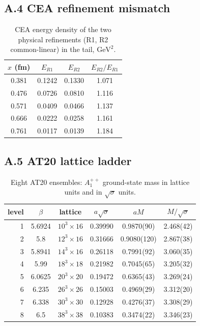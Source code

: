 \documentclass[11pt,a4paper]{article}
\theoremstyle{definition}
\theoremstyle{remark}
\newcommand{\sqs}{\sqrt{\sigma}}
\begin{document}
\subsection*{A.4 CEA refinement mismatch}
\begin{table}[ht]\centering\small\caption{CEA energy density of the two physical refinements (R1, R2 common-linear) in the tail, $\mathrm{GeV}^2$.}
\begin{tabular}{@{}cccc@{}}\toprule $x$ (fm) & $E_{R1}$ & $E_{R2}$ & $E_{R2}/E_{R1}$\\\midrule
0.381 & 0.1242 & 0.1330 & 1.071\\
0.476 & 0.0726 & 0.0810 & 1.116\\
0.571 & 0.0409 & 0.0466 & 1.137\\
0.666 & 0.0222 & 0.0258 & 1.161\\
0.761 & 0.0117 & 0.0139 & 1.184\\
\bottomrule\end{tabular}\end{table}
\subsection*{A.5 AT20 lattice ladder}
\begin{table}[ht]\centering\small\caption{Eight AT20 ensembles: $A_1^{++}$ ground-state mass in lattice units and in $\sqs$ units.}
\begin{tabular}{@{}rccccc@{}}\toprule level & $\beta$ & lattice & $a\sqs$ & $aM$ & $M/\sqs$\\\midrule
1 & 5.6924 & $10^3\times 16$ & 0.39990 & 0.9870(90) & 2.468(42)\\
2 & 5.8 & $12^3\times 16$ & 0.31666 & 0.9080(120) & 2.867(38)\\
3 & 5.8941 & $14^3\times 16$ & 0.26118 & 0.7991(92) & 3.060(35)\\
4 & 5.99 & $18^3\times 18$ & 0.21982 & 0.7045(65) & 3.205(32)\\
5 & 6.0625 & $20^3\times 20$ & 0.19472 & 0.6365(43) & 3.269(24)\\
6 & 6.235 & $26^3\times 26$ & 0.15003 & 0.4969(29) & 3.312(20)\\
7 & 6.338 & $30^3\times 30$ & 0.12928 & 0.4276(37) & 3.308(29)\\
8 & 6.5 & $38^3\times 38$ & 0.10383 & 0.3474(22) & 3.346(23)\\
\bottomrule\end{tabular}\end{table}
\end{document}

